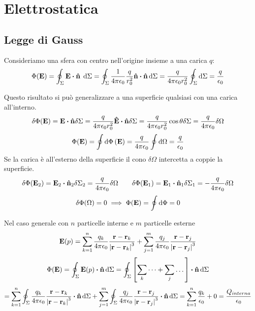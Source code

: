 \documentclass[12pt,a4paper]{article}
\begin{document}
\section{Elettrostatica}
\subsection{Legge di Gauss }
Consideriamo una sfera con centro nell'origine insieme a una carica $q$:
\begin{equation*}
    \Phi(\vb{E})= \oint_\Sigma \vb{E}\vdot \vu{n} \; \dd{\Sigma} = \oint_\Sigma \frac{1}{4\pi\epsilon_0}\frac{q}{r_0^2}\vu{n}\vdot\vu{n}\dd{\Sigma}= 
    \frac{q}{4\pi\epsilon_0r_0^2}\oint_\Sigma \dd{\Sigma} = \frac{q}{\epsilon_0}
\end{equation*}

Questo risultato si può generalizzare a una superficie qualsiasi con una carica all'interno.
\begin{equation*}
    \delta\Phi(\vb{E})= \vb{E}\vdot\vu{n} \delta \Sigma = \frac{q}{4\pi\epsilon_0r_0^2}\vu{E}\vdot\vu{n} \delta\Sigma= 
     \frac{q}{4\pi\epsilon_0r_0^2}\cos \theta \delta\Sigma=  \frac{q}{4\pi\epsilon_0} \delta\Omega
\end{equation*}
\begin{equation*}
    \Phi(\vb{E})= \oint \dd{\Phi}(\vb{E})=\frac{q}{4\pi\epsilon_0} \oint\dd{\Omega} = \frac{q}{\epsilon_0}
\end{equation*}
Se la carica è all'esterno della superficie il cono $\delta\Omega$ intercetta a coppie la superficie. 
\begin{equation*}
    \delta\Phi(\vb{E}_2)= \vb{E}_2 \vdot\vu{n}_2 \delta\Sigma_2 =  \frac{q}{4\pi\epsilon_0} \delta\Omega
    \quad \quad \delta\Phi(\vb{E}_1)= \vb{E}_1 \vdot\vu{n}_1 \delta\Sigma_1 =  - \frac{q}{4\pi\epsilon_0} \delta\Omega
\end{equation*}
\begin{equation*}
    \delta\Phi(\Omega)= 0 \implies \Phi(\vb{E})= \oint \dd{\Phi}=0
\end{equation*}

Nel caso generale con $n$ particelle interne e $m$ particelle esterne
\begin{equation*}
    \vb{E}(p)= \sum_{k=1}^{n} \frac{q_k}{4\pi\epsilon_0} \frac{\vb{r}-\vb{r}_k}{\abs{\vb{r}-\vb{r}_k}^3} +
    \sum_{j=1}^{m} \frac{q_j}{4\pi\epsilon_0} \frac{\vb{r}-\vb{r}_j}{\abs{\vb{r}-\vb{r}_j}^3} 
\end{equation*}
\begin{equation*}
    \Phi(\vb{E})= \oint_\Sigma \vb{E}(p)\vdot\vu{n} \dd{\Sigma} = \oint_\Sigma \left[ \sum_k \dots + \sum_j \dots  \right]\vdot\vu{n} \dd{\Sigma} 
\end{equation*}
\begin{equation*}
    =\sum_{k=1}^{n} \oint_\Sigma\frac{q_k}{4\pi\epsilon_0} \frac{\vb{r}-\vb{r}_k}{\abs{\vb{r}-\vb{r}_k}^3} \vdot\vu{n}\dd{\Sigma} +
    \sum_{j=1}^{m} \oint_\Sigma\frac{q_j}{4\pi\epsilon_0} \frac{\vb{r}-\vb{r}_j}{\abs{\vb{r}-\vb{r}_j}^3}\vdot\vu{n} \dd{\Sigma} 
    = \sum_{k=1}^{n} \frac{q_k}{\epsilon_0} + 0 = \frac{Q_{interna}}{\epsilon_0}
\end{equation*}
\end{document}
